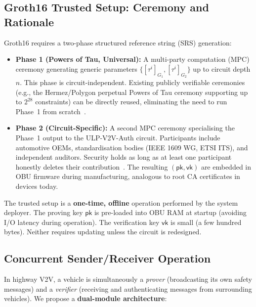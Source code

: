 \subsection{Groth16 Trusted Setup: Ceremony and Rationale}
\label{sec:trusted_setup}

Groth16 requires a two-phase structured reference string (SRS) generation:

\begin{itemize}
    \item \textbf{Phase 1 (Powers of Tau, Universal):} A multi-party computation
    (MPC) ceremony generating generic parameters $\{[\tau^i]_{G_1}, [\tau^i]_{G_2}\}$
    up to circuit depth $n$. This phase is circuit-independent. Existing publicly
    verifiable ceremonies (e.g., the Hermez/Polygon perpetual Powers of Tau
    ceremony supporting up to $2^{28}$ constraints) can be directly reused,
    eliminating the need to run Phase~1 from scratch~\cite{snarkjs_github}.

    \item \textbf{Phase 2 (Circuit-Specific):} A second MPC ceremony specialising
    the Phase~1 output to the ULP-V2V-Auth circuit. Participants include automotive
    OEMs, standardisation bodies (IEEE 1609 WG, ETSI ITS), and independent auditors.
    Security holds as long as at least one participant honestly deletes their
    contribution~\cite{bowe2017mpc}. The resulting $(\mathsf{pk}, \mathsf{vk})$ are
    embedded in OBU firmware during manufacturing, analogous to root CA certificates
    in devices today.
\end{itemize}

The trusted setup is a \textbf{one-time, offline} operation performed by the system
deployer. The proving key $\mathsf{pk}$ is pre-loaded into OBU RAM at startup
(avoiding I/O latency during operation). The verification key $\mathsf{vk}$ is
small (a few hundred bytes). Neither requires updating unless the circuit is
redesigned.

\subsection{Concurrent Sender/Receiver Operation}
\label{sec:concurrent}

In highway V2V, a vehicle is simultaneously a \emph{prover} (broadcasting its own
safety messages) and a \emph{verifier} (receiving and authenticating messages from
surrounding vehicles). We propose a \textbf{dual-module architecture}:

